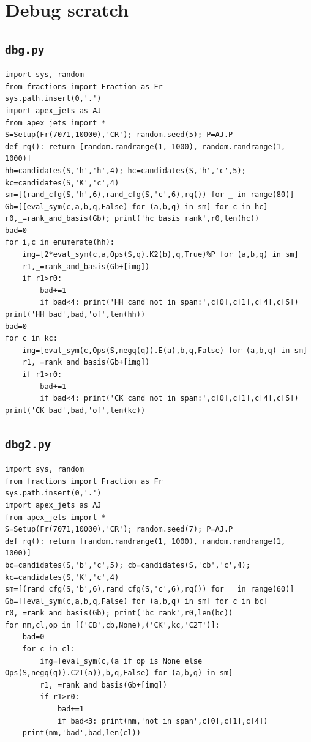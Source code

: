 \documentclass[10pt]{article}
\begin{document}
\section{Debug scratch}
\subsection{\texttt{dbg.py}}
\begin{lstlisting}
import sys, random
from fractions import Fraction as Fr
sys.path.insert(0,'.')
import apex_jets as AJ
from apex_jets import *
S=Setup(Fr(7071,10000),'CR'); random.seed(5); P=AJ.P
def rq(): return [random.randrange(1, 1000), random.randrange(1, 1000)]
hh=candidates(S,'h','h',4); hc=candidates(S,'h','c',5); kc=candidates(S,'K','c',4)
sm=[(rand_cfg(S,'h',6),rand_cfg(S,'c',6),rq()) for _ in range(80)]
Gb=[[eval_sym(c,a,b,q,False) for (a,b,q) in sm] for c in hc]
r0,_=rank_and_basis(Gb); print('hc basis rank',r0,len(hc))
bad=0
for i,c in enumerate(hh):
    img=[2*eval_sym(c,a,Ops(S,q).K2(b),q,True)%P for (a,b,q) in sm]
    r1,_=rank_and_basis(Gb+[img])
    if r1>r0:
        bad+=1
        if bad<4: print('HH cand not in span:',c[0],c[1],c[4],c[5])
print('HH bad',bad,'of',len(hh))
bad=0
for c in kc:
    img=[eval_sym(c,Ops(S,negq(q)).E(a),b,q,False) for (a,b,q) in sm]
    r1,_=rank_and_basis(Gb+[img])
    if r1>r0:
        bad+=1
        if bad<4: print('CK cand not in span:',c[0],c[1],c[4],c[5])
print('CK bad',bad,'of',len(kc))
\end{lstlisting}
\subsection{\texttt{dbg2.py}}
\begin{lstlisting}
import sys, random
from fractions import Fraction as Fr
sys.path.insert(0,'.')
import apex_jets as AJ
from apex_jets import *
S=Setup(Fr(7071,10000),'CR'); random.seed(7); P=AJ.P
def rq(): return [random.randrange(1, 1000), random.randrange(1, 1000)]
bc=candidates(S,'b','c',5); cb=candidates(S,'cb','c',4); kc=candidates(S,'K','c',4)
sm=[(rand_cfg(S,'b',6),rand_cfg(S,'c',6),rq()) for _ in range(60)]
Gb=[[eval_sym(c,a,b,q,False) for (a,b,q) in sm] for c in bc]
r0,_=rank_and_basis(Gb); print('bc rank',r0,len(bc))
for nm,cl,op in [('CB',cb,None),('CK',kc,'C2T')]:
    bad=0
    for c in cl:
        img=[eval_sym(c,(a if op is None else Ops(S,negq(q)).C2T(a)),b,q,False) for (a,b,q) in sm]
        r1,_=rank_and_basis(Gb+[img])
        if r1>r0:
            bad+=1
            if bad<3: print(nm,'not in span',c[0],c[1],c[4])
    print(nm,'bad',bad,len(cl))
\end{lstlisting}
\end{document}

